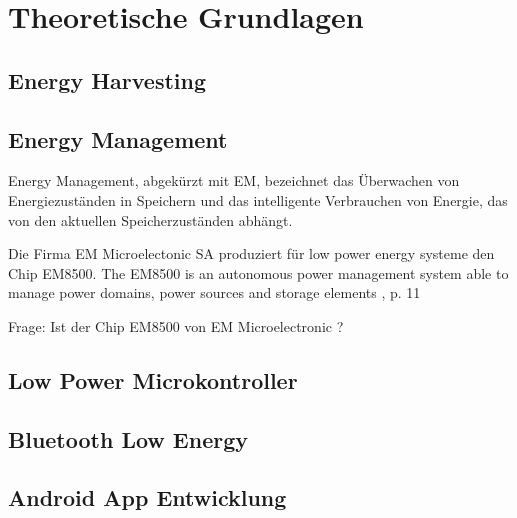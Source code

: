 \chapter{Theoretische Grundlagen}

\section{Energy Harvesting}

\section{Energy Management}
Energy Management, abgekürzt mit EM, bezeichnet das Überwachen von Energiezuständen in Speichern und das intelligente Verbrauchen von Energie, das von den aktuellen Speicherzuständen abhängt.

Die Firma EM Microelectonic SA produziert für low power energy systeme den Chip EM8500.
The EM8500 is an autonomous power management system able to manage power domains, power sources and storage elements \cite{datasheet_EM85}, p. 11



Frage:
Ist der Chip EM8500 von EM Microelectronic ?
\section{Low Power Microkontroller }

\section{Bluetooth Low Energy}

\section{Android App Entwicklung}



